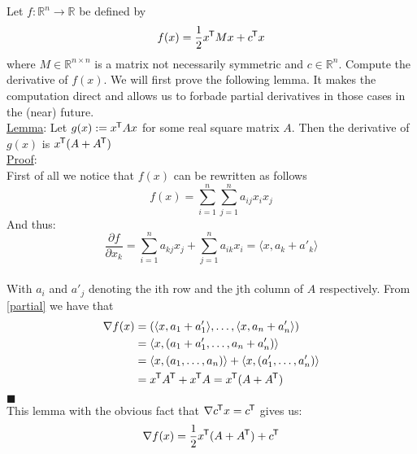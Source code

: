 \documentclass{article}
\newcommand*{\tran}{^{\mkern-1.5mu\mathsf{T}}}%
\begin{document}
	Let $f: \mathbb R^n \rightarrow \mathbb R$ be defined by 
	\begin{equation}
		f(x) = \frac{1}{2}x\tran M x + c\tran x
	\end{equation}
	where $M \in \mathbb R^{n\times n}$ is a matrix not necessarily symmetric and $c\in \mathbb R^n$. Compute the derivative of $f(x)$. We will first prove the following lemma. It makes the computation direct and allows us to forbade partial derivatives in those cases in the (near) future.\\
	\underline{Lemma}: Let $g(x) := x\tran A x$ for some real square matrix $A$. Then the derivative of $g(x)$ is $x\tran (A + A\tran)$\\
	\underline{Proof}: \\
	First of all we notice that $f(x)$ can be rewritten as follows 
	\begin{equation}
		f(x) = \sum_{i=1}^{n} \sum_{j=1}^{n} a_{ij} x_i x_j 
	\end{equation} 
	And thus:
	\begin{equation}\label{partial}
	\frac{\partial f}{\partial x_k} = \sum_{i=1}^{n}a_{kj} x_j + \sum_{j=1}^{n} a_{ik} x_i = \langle x, a_k + a'_k \rangle
	\end{equation}\\[2ex]
	With $a_i$ and $a'_j$ denoting the ith row and the jth column of $A$ respectively. From \ref{partial} we have that 
	\begin{align}
		\nabla f(x) &= \left(\langle x,a_1 + a'_1 \rangle, \ldots , \langle x, a_n +  a'_n\rangle \right)\\
		&= \langle x, (a_1 + a_1', \ldots, a_n + a'_n)\rangle\\
		&= \langle x, (a_1, \ldots, a_n)\rangle + \langle x, (a'_1, \ldots , a'_n)\rangle \\
		&= x\tran A\tran  + x\tran A = x\tran (A + A\tran)
	\end{align}
	$\blacksquare$\\
	This lemma with the obvious fact that $\nabla c\tran x = c\tran$ gives us:
	\begin{equation}
		\nabla f(x) = \frac{1}{2}x\tran (A + A\tran) + c\tran 
	\end{equation}
	\clearpage
	
\end{document}
